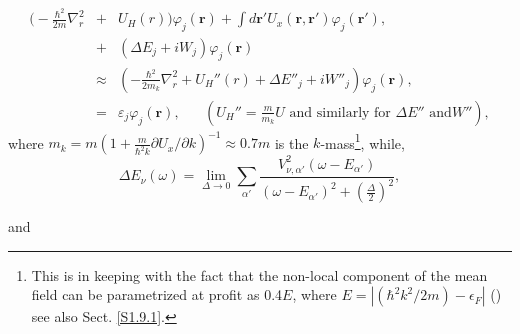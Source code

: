 \begin{eqnarray}\label{eqn:36}
\nonumber
\Big( -\frac{\hbar^2}{2m} \nabla_r^2 &+& U_H(r)\Big) \varphi_{j}(\mathbf r) + \int d\mathbf r' U_x(\mathbf r,\mathbf r')\varphi_j(\mathbf r'), \\
\nonumber
&+& (\Delta E_j +iW_j)\varphi_j(\mathbf r) \\
&\approx& \left( -\frac{\hbar^2}{2m_k} \nabla_r^2 + U_H''(r) + \Delta E''_j + iW''_j \right) \varphi_j(\mathbf r), \\
\nonumber
&=& \varepsilon_j\varphi_j(\mathbf r), \;\;\;\;\;\; \left( U_H'' = \frac{m}{m_k} U\text{ and similarly for }\Delta E''\text{ and} W'' \right), 
\end{eqnarray}
 where  $m_k=m\left(1+\frac{m}{\hbar^2 k}\partial U_x/\partial k\right)^{-1}\approx 0.7m$ is the $k$-mass\footnote{\label{f46C2}This is in keeping with the fact that the non-local component of the mean field can be parametrized at profit as 0.4$E$, where $E=|(\hbar^2k^2/2m)-\epsilon_F|$ (\cite{Perey:62}) see also Sect. \ref{S1.9.1}.},   while,
\begin{equation}\label{eqn:37a}
\Delta E_\nu(\omega)  = \lim_{\Delta \rightarrow 0} \sum_{\alpha'} \frac{V^2_{\nu ,\alpha'} (\omega-E_{\alpha'})}{(\omega -E_{\alpha'})^2 + (\frac{\Delta}{2})^2},
\end{equation}

\noindent and

